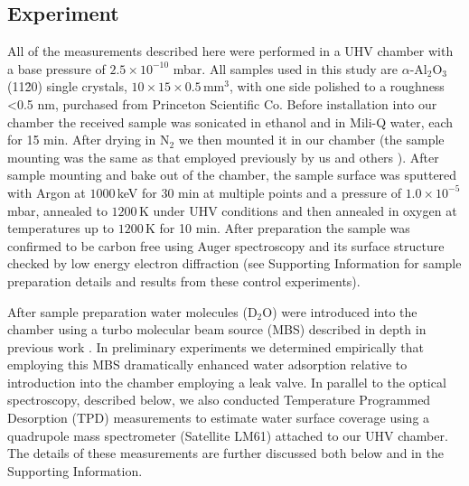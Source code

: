 \documentclass[twoside,twocolumn,9pt]{article}
\begin{document}
\subsection{Experiment}\label{ss:exp}
All of the measurements described here were performed in a UHV chamber with a base pressure of $ 2.5 \times 10^{-10}$ mbar. All samples used in this study are $\alpha$-Al$_{2}$O$_{3}$(11\=20) single crystals, $10\times15\times0.5\,$mm$^3$, with one side polished to a roughness <0.5 nm, purchased from Princeton Scientific Co. Before installation into our chamber the received sample was sonicated in ethanol and in Mili-Q water, each for 15 min. After drying in N$_{2}$ we then mounted it in our chamber (the sample mounting was the same as that employed previously by us and others \cite{Elam96,kirsch2014,wirth2016characterization}). After sample mounting and bake out of the chamber, the sample surface was sputtered with Argon at $1000\,$keV for 30 min at multiple points and a pressure of  $1.0 \times 10^{-5}\,$mbar, annealed to $1200\,$K under UHV conditions and then annealed in oxygen at temperatures up to $1200\,$K for 10 min. After preparation the sample was confirmed to be carbon free using Auger spectroscopy and its surface structure checked by low energy electron diffraction (see Supporting Information for sample preparation details and results from these control experiments).  

After sample preparation water molecules (D$_2$O) were introduced into the chamber using a turbo molecular beam source (MBS) described in depth in previous work \cite{ceye88,mcca00}. In preliminary experiments we determined empirically that employing this MBS dramatically enhanced water adsorption relative to introduction into the chamber employing a leak valve. In parallel to the optical spectroscopy, described below, we also conducted Temperature Programmed Desorption (TPD) measurements to estimate water surface coverage using a quadrupole mass spectrometer (Satellite LM61) attached to our UHV chamber. The details of these measurements are further discussed both below and in the Supporting Information.
\end{document}

